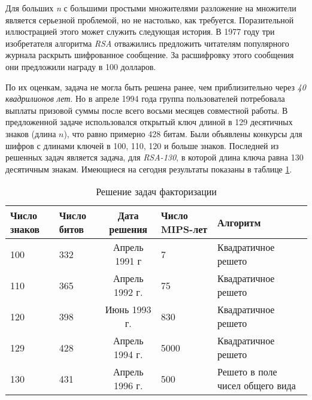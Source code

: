   Для больших \textit{n} с большими простыми множителями разложение на множители является серьезной проблемой, но не настолько, как требуется. 
  Поразительной иллюстрацией этого может служить следующая история. В 1977 году три изобретателя алгоритма
\textit{RSA} отважились предложить читателям 
  популярного журнала раскрыть шифрованное сообщение. За расшифровку этого сообщения они предложили
награду в 100 долларов.
  
  По их оценкам, задача не могла быть решена ранее, чем приблизительно через \textit{40 квадрилионов лет}. Но в апреле 1994 года группа пользователей 
потребовала выплаты призовой суммы после всего восьми месяцев совместной работы. В предложенной задаче использовался открытый ключ длиной в
129 десятичных знаков (длина $n$), что равно примерно 428 битам. Были объявлены конкурсы для шифров с длинами ключей в 100, 110, 120
и больше знаков. Последней из решенных задач является задача, для \textit{RSA-130}, в которой длина ключа 
равна 130 десятичным знакам. Имеющиеся на сегодня результаты показаны в таблице \ref{table-prime-attacks}.

\begin{table}[ht]
    \centering
    \begin{tabular}{@{}p{2.5cm}p{2.5cm}cp{2.5cm}p{4.5cm}@{}}
    \toprule
    \textbf{Число знаков} & \textbf{Число битов} & \textbf{Дата решения} & \textbf{Число MIPS-лет} & \textbf{Алгоритм} \\ \midrule
    100                              & 332                  & Апрель 1991 г         & 7                       & Квадратичное решето              \\
    110                              & 365                  & Апрель 1992 г.        & 75                      & Квадратичное решето              \\
    120                              & 398                  & Июнь 1993 г.          & 830                     & Квадратичное решето              \\
    129                              & 428                  & Апрель 1994 г.        & 5000                    & Квадратичное решето              \\
    130                              & 431                  & Апрель 1996 г.        & 500                     & Решето в поле чисел общего вида  \\ 
    \bottomrule
    \end{tabular}
    \caption{Решение задач факторизации}
    \label{table-prime-attacks}
  \end{table}

